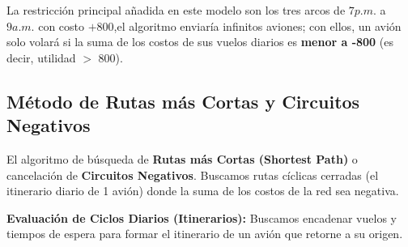 \documentclass[10pt,a4paper]{article}
\begin{document}
La restricción principal añadida en este modelo 
son los tres arcos de $7 p.m.$ a $9 a.m.$ 
con costo $+800$,el algoritmo enviaría infinitos aviones;
 con ellos, un avión solo volará si la suma de los 
 costos de sus vuelos diarios es \textbf{menor a -800} 
 (es decir, utilidad $>$ 800).

\subsection{Método de Rutas más Cortas y Circuitos Negativos}

El algoritmo de búsqueda de 
\textbf{Rutas más Cortas (Shortest Path)} o 
cancelación de \textbf{Circuitos Negativos}. 
Buscamos rutas cíclicas cerradas 
(el itinerario diario de 1 avión) 
donde la suma de los costos de la red sea negativa.

\textbf{Evaluación de Ciclos Diarios (Itinerarios):}
Buscamos encadenar vuelos y tiempos de espera para formar el itinerario de un avión que retorne a su origen.
\end{document}

